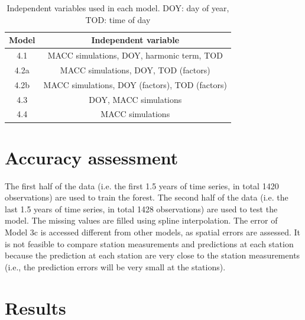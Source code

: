 \documentclass{article}
\begin{document}
\begin{table}[h!]
\centering
\begin{tabular}{ c c  }
Model &  Independent variable\\ \hline 

 4.1 & MACC simulations, DOY, harmonic term, TOD \\
 4.2a & MACC simulations, DOY, TOD (factors) \\
 4.2b & MACC simulations, DOY (factors), TOD (factors) \\ 
 4.3 & DOY, MACC simulations \\
 4.4 & MACC simulations  \\  \hline
\end{tabular}
\caption{Independent variables used in each model. DOY: day of year, TOD: time of day  } 
\label{table:rf}
\end{table}

 

\section{Accuracy assessment}

The first half of the data (i.e. the first 1.5 years of time series, in total 1420 observations) are used to train the forest. The second half of the data (i.e. the last 1.5 years of time series, in total 1428 observations) are used to test the model. The missing values are filled using spline interpolation.  
The error of Model 3c is accessed different from other models, as spatial errors are assessed. It is not feasible to compare station measurements and predictions at each station because the prediction at each station are very close to the station measurements (i.e., the prediction errors will be very small at the stations).  


\section{Results}
\end{document}
